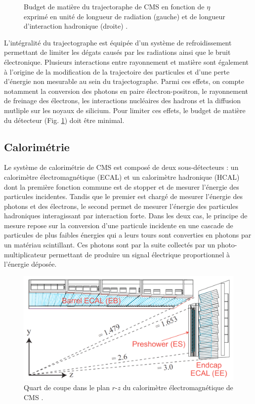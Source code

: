 \begin{figure}
\begin{subfigure}[b]{0.5\linewidth}
    \caption*{} 
    \vspace{0.5ex}
  \end{subfigure}
  \caption{Budget de matière du trajectoraphe de CMS en fonction de $\eta$ exprimé en unité de longueur de radiation (gauche) et de longueur d'interaction hadronique (droite) \cite{TrackerBudget}.}
  \label{materialbudget}
\end{figure}

L'intégralité du trajectographe est équipée d'un système de refroidissement permettant de limiter les dégats causés par les radiations ainsi que le bruit électronique. Plusieurs interactions entre rayonnement et matière sont également à l'origine de la modification de la trajectoire des particules et d'une perte d'énergie non mesurable au sein du trajectographe. Parmi ces effets, on compte notamment la conversion des photons en paire électron-positron, le rayonnement de freinage des électrons, les interactions nucléaires des hadrons et la diffusion mutliple sur les noyaux de silicium. Pour limiter ces effets, le budget de matière du détecteur (Fig. \ref{materialbudget}) doit être minimal. 

\subsection{Calorimétrie}

Le système de calorimétrie de CMS est composé de deux sous-détecteurs : un calorimètre électromagnétique (ECAL) et un calorimètre hadronique (HCAL) dont la première fonction commune est de stopper et de mesurer l'énergie des particules incidentes. Tandis que le premier est chargé de mesurer l'énergie des photons et des électrons, le second permet de mesurer l'énergie des particules hadroniques interagissant par interaction forte. Dans les deux cas, le principe de mesure repose sur la conversion d'une particule incidente en une cascade de particules de plus faibles énergies qui a leurs tours sont converties en photons par un matériau scintillant. Ces photons sont par la suite collectés par un photo-multiplicateur permettant de produire un signal électrique proportionnel à l'énergie déposée.  

\begin{figure}
\centering
    \includegraphics[scale=0.28]{Chapitre3/Images/ECAL.png} 
\caption{Quart de coupe dans le plan $r$-$z$ du calorimètre électromagnétique de CMS \cite{ECAL}.}
\label{ecal}
\end{figure}

